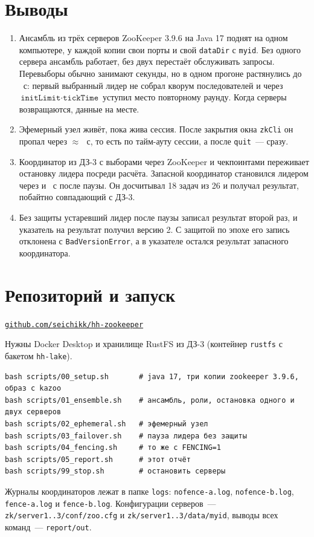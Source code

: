 \documentclass[11pt,a4paper]{article}
\newcommand{\repoUrl}{\texttt{github.com/seichikk/hh-zookeeper}}
\begin{document}
\section{Выводы}

\begin{enumerate}
  \item Ансамбль из трёх серверов ZooKeeper 3.9.6 на Java 17 поднят на одном компьютере, у каждой копии свои порты и свой \texttt{dataDir} с \texttt{myid}. Без одного сервера ансамбль работает, без двух перестаёт обслуживать запросы. Перевыборы обычно занимают секунды, но в одном прогоне растянулись до \ensReelect~с: первый выбранный лидер не собрал кворум последователей и через $\texttt{initLimit} \cdot \texttt{tickTime}$ уступил место повторному раунду. Когда серверы возвращаются, данные на месте.
  \item Эфемерный узел живёт, пока жива сессия. После закрытия окна \texttt{zkCli} он пропал через \ensuremath{\approx}\,\ephHup~с, то есть по тайм-ауту сессии, а после \texttt{quit}~--- сразу.
  \item Координатор из ДЗ-3 с выборами через ZooKeeper и чекпоинтами переживает остановку лидера посреди расчёта. Запасной координатор становился лидером через \nofenceSwitch{} и \fenceSwitch~с после паузы. Он досчитывал 18 задач из 26 и получал результат, побайтно совпадающий с ДЗ-3.
  \item Без защиты устаревший лидер после паузы записал результат второй раз, и указатель на результат получил версию 2. С защитой по эпохе его запись отклонена с \texttt{BadVersionError}, а в указателе остался результат запасного координатора.
\end{enumerate}

\appendix
\section{Репозиторий и запуск}

\begin{center}\href{https://github.com/seichikk/hh-zookeeper}{\repoUrl}\end{center}

Нужны Docker Desktop и хранилище RustFS из ДЗ-3 (контейнер \texttt{rustfs} с бакетом \texttt{hh-lake}).

\begin{Verbatim}[fontsize=\small,frame=single]
bash scripts/00_setup.sh       # java 17, три копии zookeeper 3.9.6, образ с kazoo
bash scripts/01_ensemble.sh    # ансамбль, роли, остановка одного и двух серверов
bash scripts/02_ephemeral.sh   # эфемерный узел
bash scripts/03_failover.sh    # пауза лидера без защиты
bash scripts/04_fencing.sh     # то же с FENCING=1
bash scripts/05_report.sh      # этот отчёт
bash scripts/99_stop.sh        # остановить серверы
\end{Verbatim}

Журналы координаторов лежат в папке \texttt{logs}: \texttt{nofence-a.log}, \texttt{nofence-b.log}, \texttt{fence-a.log} и \texttt{fence-b.log}. Конфигурации серверов~--- \texttt{zk/server1..3/conf/zoo.cfg} и \texttt{zk/server1..3/data/myid}, выводы всех команд~--- \texttt{report/out}.
\end{document}
